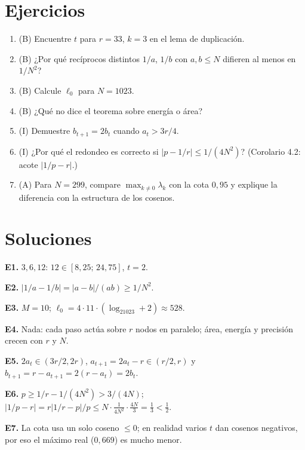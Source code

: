 \documentclass[11pt,a4paper]{article}
\begin{document}
\section{Ejercicios}
\begin{enumerate}[label=\textbf{E\arabic*.}]
\item (B) Encuentre $t$ para $r=33$, $k=3$ en el lema de duplicación.
\item (B) ¿Por qué recíprocos distintos $1/a$, $1/b$ con $a,b\le N$ difieren al menos en $1/N^2$?
\item (B) Calcule $\ell_0$ para $N=1023$.
\item (B) ¿Qué no dice el teorema sobre energía o área?
\item (I) Demuestre $b_{t+1}=2b_t$ cuando $a_t>3r/4$.
\item (I) ¿Por qué el redondeo es correcto si $|p-1/r|\le1/(4N^2)$? (Corolario 4.2: acote $|1/p-r|$.)
\item (A) Para $N=299$, compare $\max_{k\ne0}\lambda_k$ con la cota $0{,}95$ y explique la diferencia con la estructura de los cosenos.
\end{enumerate}
\section{Soluciones}
\begin{solucion}
\textbf{E1.} $3,6,12$: $12\in[8{,}25;\,24{,}75]$, $t=2$.

\textbf{E2.} $|1/a-1/b|=|a-b|/(ab)\ge1/N^2$.

\textbf{E3.} $M=10$; $\ell_0=4\cdot11\cdot(\log_21023+2)\approx528$.

\textbf{E4.} Nada: cada paso actúa sobre $r$ nodos en paralelo; área, energía y precisión crecen con $r$ y $N$.

\textbf{E5.} $2a_t\in(3r/2,2r)$, $a_{t+1}=2a_t-r\in(r/2,r)$ y $b_{t+1}=r-a_{t+1}=2(r-a_t)=2b_t$.

\textbf{E6.} $p\ge1/r-1/(4N^2)>3/(4N)$; $|1/p-r|=r|1/r-p|/p\le N\cdot\frac1{4N^2}\cdot\frac{4N}3=\frac13<\frac12$.

\textbf{E7.} La cota usa un solo coseno $\le0$; en realidad varios $t$ dan cosenos negativos, por eso el máximo real ($0{,}669$) es mucho menor.
\end{solucion}
\end{document}
